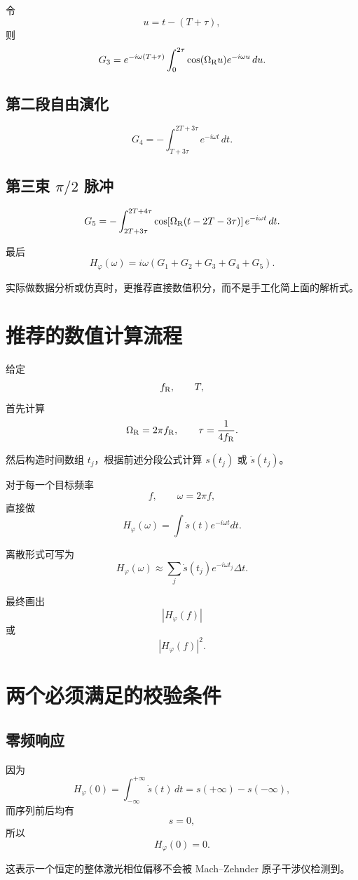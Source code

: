 \documentclass[UTF8,12pt,a4paper,fontset=fandol]{ctexart}
\begin{document}
令
\[
u=t-(T+\tau),
\]
则
\[
G_3
=
e^{-i\omega(T+\tau)}
\int_0^{2\tau}
\cos(\Omega_{\rm R}u)e^{-i\omega u}\,du.
\]

\subsection*{第二段自由演化}
\[
G_4
=
-\int_{T+3\tau}^{2T+3\tau}
e^{-i\omega t}\,dt.
\]

\subsection*{第三束 $\pi/2$ 脉冲}
\[
G_5
=
-\int_{2T+3\tau}^{2T+4\tau}
\cos\!\left[\Omega_{\rm R}(t-2T-3\tau)\right]
e^{-i\omega t}\,dt.
\]

最后
\[
\boxed{
H_\varphi(\omega)
=
i\omega
\left(
G_1+G_2+G_3+G_4+G_5
\right)
}.
\]

实际做数据分析或仿真时，更推荐直接数值积分，而不是手工化简上面的解析式。

\section{推荐的数值计算流程}

给定
\[
f_{\rm R},\qquad T,
\]
首先计算
\[
\Omega_{\rm R}=2\pi f_{\rm R},
\qquad
\tau=\frac{1}{4f_{\rm R}}.
\]

然后构造时间数组 $t_j$，根据前述分段公式计算 $s(t_j)$ 或 $\dot s(t_j)$。

对于每一个目标频率
\[
f,
\qquad
\omega=2\pi f,
\]
直接做
\[
\boxed{
H_\varphi(\omega)
=
\int
\dot s(t)e^{-i\omega t}dt
}.
\]

离散形式可写为
\[
H_\varphi(\omega)
\approx
\sum_j
\dot s(t_j)e^{-i\omega t_j}\Delta t.
\]

最终画出
\[
|H_\varphi(f)|
\]
或
\[
|H_\varphi(f)|^2.
\]

\section{两个必须满足的校验条件}

\subsection{零频响应}

因为
\[
H_\varphi(0)
=
\int_{-\infty}^{+\infty}
\dot s(t)\,dt
=
s(+\infty)-s(-\infty),
\]
而序列前后均有
\[
s=0,
\]
所以
\[
\boxed{
H_\varphi(0)=0
}.
\]

这表示一个恒定的整体激光相位偏移不会被 Mach--Zehnder 原子干涉仪检测到。
\end{document}

